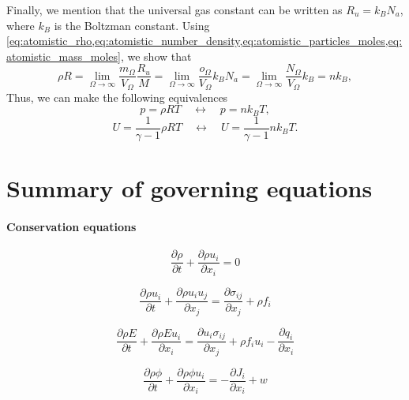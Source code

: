 \documentclass[oneside,a4paper,11pt]{report}
\begin{document}
Finally, we mention that the universal gas constant can be written as $R_u = k_B N_a$, where $k_B$ is the Boltzman constant. Using \cref{eq:atomistic_rho,eq:atomistic_number_density,eq:atomistic_particles_moles,eq:atomistic_mass_moles}, we show that
\begin{equation}
    \rho R = \lim_{\Omega \to \infty} \frac{m_\Omega}{V_\Omega} \frac{R_u}{M} = \lim_{\Omega \to \infty} \frac{o_\Omega}{V_\Omega} k_B N_a = \lim_{\Omega \to \infty} \frac{N_\Omega}{V_\Omega} k_B = n k_B,
\end{equation}
Thus, we can make the following equivalences
\begin{equation}
    p = \rho R T \quad \longleftrightarrow \quad p = nk_B T,
\end{equation}
\begin{equation}
    U = \frac{1}{\gamma - 1} \rho R T \quad \longleftrightarrow \quad U = \frac{1}{\gamma - 1} n k_B T.
\end{equation}
\section{Summary of governing equations}

\paragraph{Conservation equations}

\begin{equation*}
    \frac{\partial \rho}{\partial t} + \frac{\partial \rho u_i}{\partial x_i} = 0
\end{equation*}

\begin{equation*}
\frac{\partial \rho u_i}{\partial t} + \frac{\partial \rho u_i u_j}{\partial x_j} = \frac{\partial \sigma_{ij}}{\partial x_j} + \rho f_i
\end{equation*}

\begin{equation*}
\frac{\partial \rho E}{\partial t} + \frac{\partial \rho E u_i}{\partial x_i} = \frac{\partial u_i \sigma_{ij}}{\partial x_j} + \rho f_i u_i -  \frac{\partial q_i}{\partial x_i}
\end{equation*}

\begin{equation*}
    \frac{\partial\rho \phi}{\partial t}+\frac{\partial \rho \phi u_i}{\partial x_i} = -\frac{\partial J_i}{\partial x_i} + w
\end{equation*}
\end{document}
